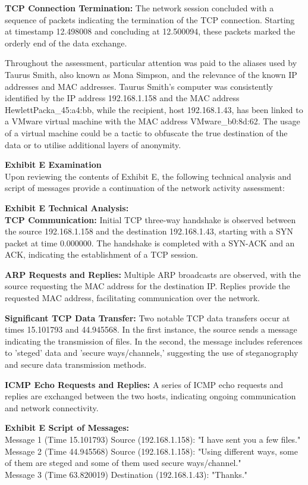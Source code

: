 \textbf{TCP Connection Termination:} The network session concluded with a sequence of packets indicating the termination of the TCP connection. Starting at timestamp 12.498008 and concluding at 12.500094, these packets marked the orderly end of the data exchange.

Throughout the assessment, particular attention was paid to the aliases used by Taurus Smith, also known as Mona Simpson, and the relevance of the known IP addresses and MAC addresses. Taurus Smith's computer was consistently identified by the IP address 192.168.1.158 and the MAC address HewlettPacka\_45:a4:bb, while the recipient, host 192.168.1.43, has been linked to a VMware virtual machine with the MAC address VMware\_b0:8d:62. The usage of a virtual machine could be a tactic to obfuscate the true destination of the data or to utilise additional layers of anonymity.

\textbf{Exhibit E Examination}\\
Upon reviewing the contents of Exhibit E, the following technical analysis and script of messages provide a continuation of the network activity assessment:

\textbf{Exhibit E Technical Analysis:}\\
\textbf{TCP Communication:} Initial TCP three-way handshake is observed between the source 192.168.1.158 and the destination 192.168.1.43, starting with a SYN packet at time 0.000000. The handshake is completed with a SYN-ACK and an ACK, indicating the establishment of a TCP session.

\textbf{ARP Requests and Replies:} Multiple ARP broadcasts are observed, with the source requesting the MAC address for the destination IP. Replies provide the requested MAC address, facilitating communication over the network.

\textbf{Significant TCP Data Transfer:} Two notable TCP data transfers occur at times 15.101793 and 44.945568. In the first instance, the source sends a message indicating the transmission of files. In the second, the message includes references to 'steged' data and 'secure ways/channels,' suggesting the use of steganography and secure data transmission methods.

\textbf{ICMP Echo Requests and Replies:} A series of ICMP echo requests and replies are exchanged between the two hosts, indicating ongoing communication and network connectivity.

\textbf{Exhibit E Script of Messages:}\\
Message 1 (Time 15.101793) Source (192.168.1.158): "I have sent you a few files."\\
Message 2 (Time 44.945568) Source (192.168.1.158): "Using different ways, some of them are steged and some of them used secure ways/channel."\\
Message 3 (Time 63.820019) Destination (192.168.1.43): "Thanks."

